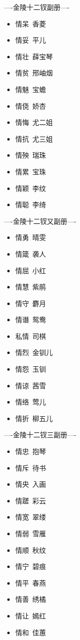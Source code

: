 \documentclass[12pt,oneside]{book}
\begin{document}
   
----金陵十二钗副册----

\begin{itemize}
\item 情呆~香菱
\item 情妥~平儿
\item 情壮~薛宝琴
\item 情贫~邢岫烟
\item 情魅~宝蟾
\item 情侥~娇杏
\item 情悔~尤二姐
\item 情抗~尤三姐
\item 情殃~瑞珠
\item 情累~宝珠
\item 情颖~李纹
\item 情聪~李绮 
\end{itemize}

   
----金陵十二钗又副册----

\begin{itemize}
\item 情勇~晴雯
\item 情箴~袭人
\item 情屈~小红
\item 情慧~紫鹃 
\item 情守~麝月
\item 情谮~鸳鸯
\item 私情~司棋
\item 情烈~金钏儿
\item 情怨~玉钏
\item 情谅~茜雪
\item 情络~莺儿
\item 情折~柳五儿
\end{itemize}



----金陵十二钗三副册----

\begin{itemize}
\item 情忠~抱琴
\item 情斥~待书
\item 情央~入画
\item 情蹉~彩云
\item 情宽~翠缕
\item 情弱~雪雁
\item 情顺~秋纹
\item 情宁~碧痕
\item 情平~春燕
\item 情善~绣橘
\item 情让~嫣红
\item 情和~佳蕙
\end{itemize}
\end{document}
